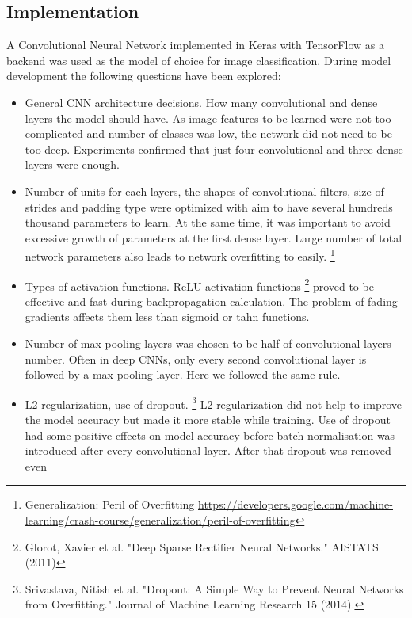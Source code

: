 \documentclass[a4paper]{article}
\begin{document}
\subsection*{Implementation}

A Convolutional Neural Network implemented in Keras with TensorFlow as a backend was used as the model
of choice for image classification. During model development the following questions have been explored:

\begin{itemize}
    \item General CNN architecture decisions. How many convolutional and dense layers the model should have.
    As image features to be learned were not too complicated and number of classes was low, the network did
    not need to be too deep. Experiments confirmed that just four convolutional and three dense layers were enough.
    \item Number of units for each layers, the shapes of convolutional filters, size of strides and padding type
    were optimized with aim to have several hundreds thousand parameters to learn. At the same time, it was
    important to avoid excessive growth of parameters at the first dense layer.
    Large number of total network parameters also leads to network overfitting to easily.
    \footnote{Generalization: Peril of Overfitting 
        \url{https://developers.google.com/machine-learning/crash-course/generalization/peril-of-overfitting}}
    \item Types of activation functions. ReLU activation functions
    \footnote{Glorot, Xavier et al. "Deep Sparse Rectifier Neural Networks."
    AISTATS (2011)}
    proved to be effective and fast during backpropagation calculation. The problem of fading gradients
    affects them less than sigmoid or tahn functions.
    \item Number of max pooling layers was chosen to be half of convolutional layers number. Often in deep CNNs,
    only every second convolutional layer is followed by a max pooling layer. Here we followed the same rule.
    \item L2 regularization, use of dropout.
    \footnote{Srivastava, Nitish et al.
        "Dropout: A Simple Way to Prevent Neural Networks from Overfitting."
        Journal of Machine Learning Research 15 (2014).}
    L2 regularization did not help to improve the model accuracy but
    made it more stable while training. Use of dropout had some positive effects on model accuracy before
    batch normalisation was introduced after every convolutional layer. After that dropout was removed even

\end{itemize}
\end{document}
